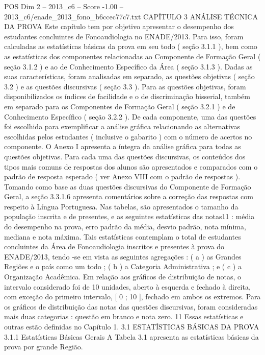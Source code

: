 \begin{textsample}{POS Dim 2 – 2013\_c6 – Score -1.00 – 2013\_c6/enade\_2013\_fono\_b6ccec77c7.txt}  \label{ex:f2_pos_376}
CAPÍTULO 3 ANÁLISE TÉCNICA DA PROVA Este capítulo tem por objetivo apresentar o desempenho dos estudantes concluintes de Fonoaudiologia no ENADE/2013.
Para isso, foram calculadas as estatísticas básicas da prova em seu todo ( seção 3.1.1 ), bem como as estatísticas dos componentes relacionadas ao Componente de Formação Geral ( seção 3.1.2 ) e ao de Conhecimento Específico da Área ( seção 3.1.3 ).
Dadas as suas características, foram analisadas em separado, as questões objetivas ( seção 3.2 ) e as questões discursivas ( seção 3.3 ).
Para as questões objetivas, foram disponibilizados os índices de facilidade e o de discriminação bisserial, também em separado para os Componentes de Formação Geral ( seção 3.2.1 ) e de Conhecimento Específico ( seção 3.2.2 ).
De cada componente, uma das questões foi escolhida para exemplificar a análise gráfica relacionando as alternativas escolhidas pelos estudantes ( inclusive o gabarito ) com o número de acertos no componente.
O Anexo I apresenta a íntegra da análise gráfica para todas as questões objetivas.
Para cada uma das questões discursivas, os conteúdos dos tipos mais comuns de respostas dos alunos são apresentados e comparados com o padrão de resposta esperado ( ver Anexo VIII com o padrão de respostas ).
Tomando como base as duas questões discursivas do Componente de Formação Geral, a seção 3.3.1.6 apresenta comentários sobre a correção das respostas com respeito à Língua Portuguesa.
Nas tabelas, são apresentados o tamanho da população inscrita e de presentes, e as seguintes estatísticas das notas11 : média do desempenho na prova, erro padrão da média, desvio padrão, nota mínima, mediana e nota máxima.
Tais estatísticas contemplam o total de estudantes concluintes da Área de Fonoaudiologia inscritos e presentes à prova do ENADE/2013, tendo -se em vista as seguintes agregações : ( a ) as Grandes Regiões e o país como um todo ; ( b ) a Categoria Administrativa ; e ( c ) a Organização Acadêmica.
Em relação aos gráficos de distribuição de notas, o intervalo considerado foi de 10 unidades, aberto à esquerda e fechado à direita, com exceção do primeiro intervalo, [ 0 ; 10 ], fechado em ambos os extremos.
Para os gráficos de distribuição das notas das questões discursivas, foram consideradas mais duas categorias : questão em branco e nota zero. 11 Essas estatísticas e outras estão definidas no Capítulo 1. 3.1 ESTATÍSTICAS BÁSICAS DA PROVA 3.1.1 Estatísticas Básicas Gerais A Tabela 3.1 apresenta as estatísticas básicas da prova por grande Região.

\end{textsample}
